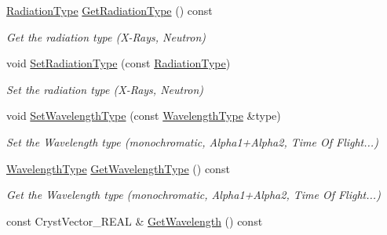\begin{DoxyCompactItemize}
\mbox{\hyperlink{namespace_obj_cryst_a48fe50a094c607f8897378934d3d73ef}{Radiation\+Type}} \mbox{\hyperlink{class_obj_cryst_1_1_radiation_ae369d0c6868a6291af6527ada096a768}{Get\+Radiation\+Type}} () const
\begin{DoxyCompactList}\small\item\em Get the radiation type (X-\/\+Rays, Neutron) \end{DoxyCompactList}\item 
\mbox{\label{class_obj_cryst_1_1_radiation_a8fd969b9f546fc48f5bfd7b38ff9c995}} 
void \mbox{\hyperlink{class_obj_cryst_1_1_radiation_a8fd969b9f546fc48f5bfd7b38ff9c995}{Set\+Radiation\+Type}} (const \mbox{\hyperlink{namespace_obj_cryst_a48fe50a094c607f8897378934d3d73ef}{Radiation\+Type}})
\begin{DoxyCompactList}\small\item\em Set the radiation type (X-\/\+Rays, Neutron) \end{DoxyCompactList}\item 
\mbox{\label{class_obj_cryst_1_1_radiation_adc4fac12bb11e01e515365e5d7a46ddc}} 
void \mbox{\hyperlink{class_obj_cryst_1_1_radiation_adc4fac12bb11e01e515365e5d7a46ddc}{Set\+Wavelength\+Type}} (const \mbox{\hyperlink{namespace_obj_cryst_a551a5807d5afe2d986758d9a6953a880}{Wavelength\+Type}} \&type)
\begin{DoxyCompactList}\small\item\em Set the Wavelength type (monochromatic, Alpha1+\+Alpha2, Time Of Flight...) \end{DoxyCompactList}\item 
\mbox{\label{class_obj_cryst_1_1_radiation_a57eeae457d44ebb07216e144bbff31b0}} 
\mbox{\hyperlink{namespace_obj_cryst_a551a5807d5afe2d986758d9a6953a880}{Wavelength\+Type}} \mbox{\hyperlink{class_obj_cryst_1_1_radiation_a57eeae457d44ebb07216e144bbff31b0}{Get\+Wavelength\+Type}} () const
\begin{DoxyCompactList}\small\item\em Get the Wavelength type (monochromatic, Alpha1+\+Alpha2, Time Of Flight...) \end{DoxyCompactList}\item 
const Cryst\+Vector\+\_\+\+R\+E\+AL \& \mbox{\hyperlink{class_obj_cryst_1_1_radiation_a692ac2a7e9e4462e85479476f0485810}{Get\+Wavelength}} () const

\end{DoxyCompactItemize}
